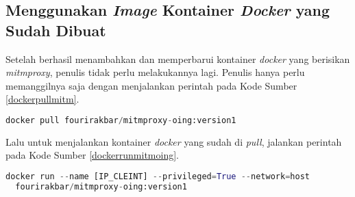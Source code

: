   \subsection{Menggunakan \textit{Image} Kontainer \textit{Docker} yang Sudah Dibuat}
  Setelah berhasil menambahkan dan memperbarui kontainer \textit{docker} yang berisikan \textit{mitmproxy}, penulis tidak perlu melakukannya lagi. Penulis hanya perlu memanggilnya saja dengan menjalankan perintah pada Kode Sumber \ref{dockerpullmitm}.
  \newline
  \begin{minipage}{\linewidth}
  \begin{lstlisting}[caption=Perintah untuk \textit{Pull Image mitmproxy},language=Python,label=dockerpullmitm]
  docker pull fourirakbar/mitmproxy-oing:version1
  \end{lstlisting}
  \end{minipage}
  Lalu untuk menjalankan kontainer \textit{docker} yang sudah di \textit{pull}, jalankan perintah pada Kode Sumber \ref{dockerrunmitmoing}.
  \newline
  \begin{minipage}{\linewidth}
  \begin{lstlisting}[caption=Perintah untuk \textit{Pull Image mitmproxy},language=Python,label=dockerrunmitmoing]
  docker run --name [IP_CLEINT] --privileged=True --network=host 
  fourirakbar/mitmproxy-oing:version1
  \end{lstlisting}
  \end{minipage}